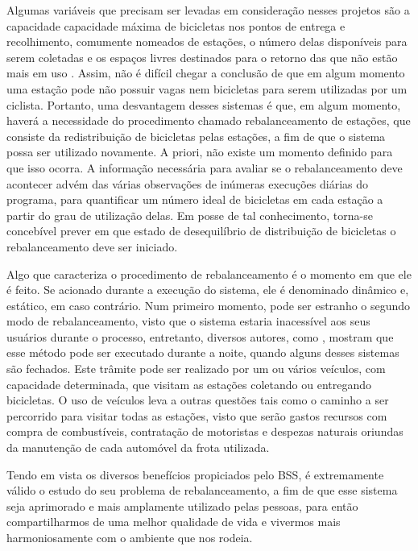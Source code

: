 \par Algumas variáveis que precisam ser levadas em consideração nesses projetos são a capacidade capacidade máxima de bicicletas nos pontos de entrega e recolhimento, comumente nomeados de estações, o número delas disponíveis para serem coletadas e os espaços livres destinados para o retorno das que não estão mais em uso \citep{art:REF_ART_1}. Assim, não é difícil chegar a conclusão de que em algum momento uma estação pode não possuir vagas nem bicicletas para serem utilizadas por um ciclista. Portanto, uma desvantagem desses sistemas é que, em algum momento, haverá a necessidade do procedimento chamado rebalanceamento de estações, que consiste da redistribuição de bicicletas pelas estações, a fim de que o sistema possa ser utilizado novamente. A priori, não existe um momento definido para que isso ocorra. A informação necessária para avaliar se o rebalanceamento deve acontecer advém das várias observações de inúmeras execuções diárias do programa, para quantificar um número ideal de bicicletas em cada estação a partir do grau de utilização delas. Em posse de tal conhecimento, torna-se concebível prever em que estado de desequilíbrio de distribuição de bicicletas o rebalanceamento deve ser iniciado. \par Algo que caracteriza o procedimento de rebalanceamento é o momento em que ele é feito. Se acionado durante a execução do sistema, ele é denominado dinâmico e, estático, em caso contrário. Num primeiro momento, pode ser estranho o segundo modo de rebalanceamento, visto que o sistema estaria inacessível aos seus usuários durante o processo, entretanto, diversos autores, como \citep{art:REF_ART_2}, mostram que esse método pode ser executado durante a noite, quando alguns desses sistemas são fechados. Este trâmite pode ser realizado por um ou vários veículos, com capacidade determinada, que visitam as estações coletando ou entregando bicicletas. O uso de veículos leva a outras questões tais como o caminho a ser percorrido para visitar todas as estações, visto que serão gastos recursos com compra de combustíveis, contratação de motoristas e  despezas naturais oriundas da manutenção de cada automóvel da frota utilizada. \par Tendo em vista os diversos benefícios propiciados pelo BSS, é extremamente válido o estudo do seu problema de rebalanceamento, a fim de que esse sistema seja aprimorado e mais amplamente utilizado pelas pessoas, para então compartilharmos de uma melhor qualidade de vida e vivermos mais harmoniosamente com o ambiente que nos rodeia.

